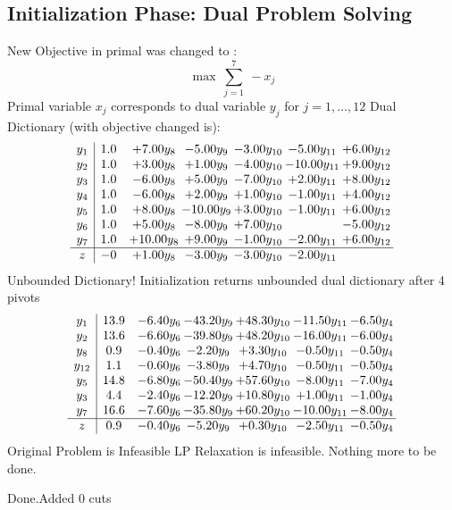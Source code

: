 \documentclass[8pt]{article}
\begin{document}
\subsection{Initialization Phase: Dual Problem Solving}
New Objective in primal was changed to : \[ \max\ \sum_{j=1}^{7}\ - x_j \] 
Primal variable $x_j$ corresponds to dual variable $y_j$ for $j = 1,\ldots,12$
Dual Dictionary (with objective changed is): 
\[\begin{array}{c| c c@{\hskip 2pt} c@{\hskip 2pt} c@{\hskip 2pt} c@{\hskip 2pt} c@{\hskip 2pt} }
 y_{1}   &  1.0 & +  7.00 y_{8} & -5.00 y_{9} & -3.00 y_{10} & -5.00 y_{11} & +  6.00 y_{12}\\
 y_{2}   &  1.0 & +  3.00 y_{8} & +  1.00 y_{9} & -4.00 y_{10} & -10.00 y_{11} & +  9.00 y_{12}\\
 y_{3}   &  1.0 & -6.00 y_{8} & +  5.00 y_{9} & -7.00 y_{10} & +  2.00 y_{11} & +  8.00 y_{12}\\
 y_{4}   &  1.0 & -6.00 y_{8} & +  2.00 y_{9} & +  1.00 y_{10} & -1.00 y_{11} & +  4.00 y_{12}\\
 y_{5}   &  1.0 & +  8.00 y_{8} & -10.00 y_{9} & +  3.00 y_{10} & -1.00 y_{11} & +  6.00 y_{12}\\
 y_{6}   &  1.0 & +  5.00 y_{8} & -8.00 y_{9} & +  7.00 y_{10} &   & -5.00 y_{12}\\
 y_{7}   &  1.0 & + 10.00 y_{8} & +  9.00 y_{9} & -1.00 y_{10} & -2.00 y_{11} & +  6.00 y_{12}\\
\hline
z    &  -0 & +  1.00 y_{8} & -3.00 y_{9} & -3.00 y_{10} & -2.00 y_{11} &   \\
\end{array}\]
Unbounded Dictionary!
Initialization returns unbounded dual dictionary after 4 pivots
\[\begin{array}{c| c c@{\hskip 2pt} c@{\hskip 2pt} c@{\hskip 2pt} c@{\hskip 2pt} c@{\hskip 2pt} }
 y_{1}   &  13.9 & -6.40 y_{6} & -43.20 y_{9} & + 48.30 y_{10} & -11.50 y_{11} & -6.50 y_{4}\\
 y_{2}   &  13.6 & -6.60 y_{6} & -39.80 y_{9} & + 48.20 y_{10} & -16.00 y_{11} & -6.00 y_{4}\\
 y_{8}   &  0.9 & -0.40 y_{6} & -2.20 y_{9} & +  3.30 y_{10} & -0.50 y_{11} & -0.50 y_{4}\\
 y_{12}   &  1.1 & -0.60 y_{6} & -3.80 y_{9} & +  4.70 y_{10} & -0.50 y_{11} & -0.50 y_{4}\\
 y_{5}   &  14.8 & -6.80 y_{6} & -50.40 y_{9} & + 57.60 y_{10} & -8.00 y_{11} & -7.00 y_{4}\\
 y_{3}   &  4.4 & -2.40 y_{6} & -12.20 y_{9} & + 10.80 y_{10} & +  1.00 y_{11} & -1.00 y_{4}\\
 y_{7}   &  16.6 & -7.60 y_{6} & -35.80 y_{9} & + 60.20 y_{10} & -10.00 y_{11} & -8.00 y_{4}\\
\hline
z    &  0.9 & -0.40 y_{6} & -5.20 y_{9} & +  0.30 y_{10} & -2.50 y_{11} & -0.50 y_{4}\\
\end{array}\]
Original Problem is Infeasible
 LP Relaxation is infeasible. Nothing more to be done. 

Done.Added 0 cuts 
\end{document}
